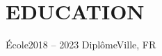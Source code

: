 \section{EDUCATION}
\resumeSubHeadingListStart
    \resumeSubheading
    {École}{2018 -- 2023}
    {Diplôme}{Ville, FR}
    \resumeItemListStart
    \resumeItemListEnd
\resumeSubHeadingListEnd 